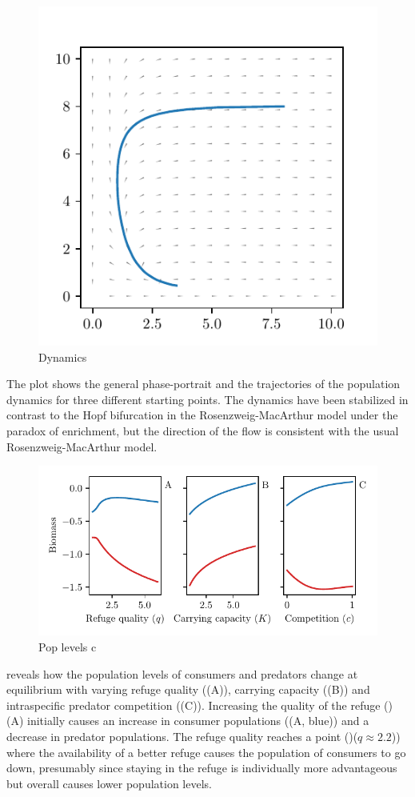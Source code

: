 \begin{figure}[H]
  \caption{Dynamics}
  \label{fig:dynamics}
  \includegraphics{plots/dynamics.pdf}
\end{figure}
The plot  shows the general phase-portrait and the trajectories of the population dynamics for three different starting points. The dynamics have been stabilized in contrast to the Hopf  bifurcation in the Rosenzweig-MacArthur model under the paradox of enrichment, but the direction of the flow is consistent with the usual Rosenzweig-MacArthur model.
\begin{figure}[H]
  \caption{Pop levels c}
  \label{fig:pop_levels}
  \includegraphics{plots/pop_levels_c.pdf}
\end{figure}
 reveals how the population levels of consumers and predators change at equilibrium with varying refuge quality ((A)), carrying capacity ((B)) and intraspecific predator competition ((C)).
Increasing the quality of the refuge ()(A) initially causes an increase in consumer populations ((A, blue)) and a decrease in predator populations. The refuge quality reaches a point ()($q \approx 2.2$)) where the availability of a better refuge causes the population of consumers to go down, presumably since staying in the refuge is individually more advantageous but overall causes lower population levels.

